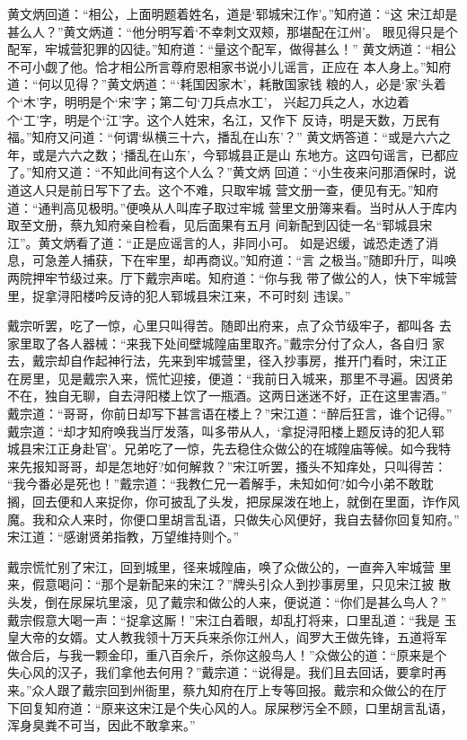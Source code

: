 黄文炳回道：“相公，上面明题着姓名，道是‘郓城宋江作’。”知府道：“这
宋江却是甚么人？”黄文炳道：“他分明写着‘不幸刺文双颊，那堪配在江州’。
眼见得只是个配军，牢城营犯罪的囚徒。”知府道：“量这个配军，做得甚么！”
黄文炳道：“相公不可小觑了他。恰才相公所言尊府恩相家书说小儿谣言，正应在
本人身上。”知府道：“何以见得？”黄文炳道：“‘耗国因家木’，耗散国家钱
粮的人，必是‘家’头着个‘木’字，明明是个‘宋’字；第二句‘刀兵点水工’，
兴起刀兵之人，水边着个‘工’字，明是个‘江’字。这个人姓宋，名江，又作下
反诗，明是天数，万民有福。”知府又问道：“何谓‘纵横三十六，播乱在山东’？”
黄文炳答道：“或是六六之年，或是六六之数；‘播乱在山东’，今郓城县正是山
东地方。这四句谣言，已都应了。”知府又道：“不知此间有这个人么？”黄文炳
回道：“小生夜来问那酒保时，说道这人只是前日写下了去。这个不难，只取牢城
营文册一查，便见有无。”知府道：“通判高见极明。”便唤从人叫库子取过牢城
营里文册簿来看。当时从人于库内取至文册，蔡九知府亲自检看，见后面果有五月
间新配到囚徒一名“郓城县宋江”。黄文炳看了道：“正是应谣言的人，非同小可。
如是迟缓，诚恐走透了消息，可急差人捕获，下在牢里，却再商议。”知府道：“言
之极当。”随即升厅，叫唤两院押牢节级过来。厅下戴宗声喏。知府道：“你与我
带了做公的人，快下牢城营里，捉拿浔阳楼吟反诗的犯人郓城县宋江来，不可时刻
违误。”

戴宗听罢，吃了一惊，心里只叫得苦。随即出府来，点了众节级牢子，都叫各
去家里取了各人器械：“来我下处间壁城隍庙里取齐。”戴宗分付了众人，各自归
家去，戴宗却自作起神行法，先来到牢城营里，径入抄事房，推开门看时，宋江正
在房里，见是戴宗入来，慌忙迎接，便道：“我前日入城来，那里不寻遍。因贤弟
不在，独自无聊，自去浔阳楼上饮了一瓶酒。这两日迷迷不好，正在这里害酒。”
戴宗道：“哥哥，你前日却写下甚言语在楼上？”宋江道：“醉后狂言，谁个记得。”
戴宗道：“却才知府唤我当厅发落，叫多带从人，‘拿捉浔阳楼上题反诗的犯人郓
城县宋江正身赴官’。兄弟吃了一惊，先去稳住众做公的在城隍庙等候。如今我特
来先报知哥哥，却是怎地好?如何解救？”宋江听罢，搔头不知痒处，只叫得苦：
“我今番必是死也！”戴宗道：“我教仁兄一着解手，未知如何?如今小弟不敢耽
搁，回去便和人来捉你，你可披乱了头发，把尿屎泼在地上，就倒在里面，诈作风
魔。我和众人来时，你便口里胡言乱语，只做失心风便好，我自去替你回复知府。”
宋江道：“感谢贤弟指教，万望维持则个。”

戴宗慌忙别了宋江，回到城里，径来城隍庙，唤了众做公的，一直奔入牢城营
里来，假意喝问：“那个是新配来的宋江？”牌头引众人到抄事房里，只见宋江披
散头发，倒在尿屎坑里滚，见了戴宗和做公的人来，便说道：“你们是甚么鸟人？”
戴宗假意大喝一声：“捉拿这厮！”宋江白着眼，却乱打将来，口里乱道：“我是
玉皇大帝的女婿。丈人教我领十万天兵来杀你江州人，阎罗大王做先锋，五道将军
做合后，与我一颗金印，重八百余斤，杀你这般鸟人！”众做公的道：“原来是个
失心风的汉子，我们拿他去何用？”戴宗道：“说得是。我们且去回话，要拿时再
来。”众人跟了戴宗回到州衙里，蔡九知府在厅上专等回报。戴宗和众做公的在厅
下回复知府道：“原来这宋江是个失心风的人。尿屎秽污全不顾，口里胡言乱语，
浑身臭粪不可当，因此不敢拿来。”

